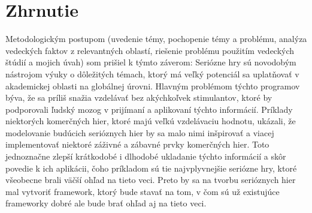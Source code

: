\documentclass[10pt,twoside,slovak,a4paper]{article}
\begin{document}
\section{Zhrnutie} \label{zaver}
Metodologickým postupom (uvedenie témy, pochopenie témy a problému, analýza vedeckých faktov z relevantných oblastí, riešenie problému použitím vedeckých štúdií a mojich úvah) som prišiel k týmto záverom: Seriózne hry sú novodobým nástrojom výuky o dôležitých témach, ktorý má veľký potenciál sa uplatňovať v akademickej oblasti na globálnej úrovni. Hlavným problémom týchto programov býva, že sa príliš snažia vzdelávať bez akýchkoľvek stimulantov, ktoré by podporovali ľudský mozog v prijímaní a aplikovaní týchto informácií. Príklady niektorých komerčných hier, ktoré majú veľkú vzdelávaciu hodnotu, ukázali, že modelovanie budúcich serióznych hier by sa malo nimi inšpirovať a viacej implementovať niektoré záživné a zábavné prvky komerčných hier. Toto jednoznačne zlepší krátkodobé i dlhodobé ukladanie týchto informácií a skôr povedie k ich aplikácii, čoho príkladom sú tie najvplyvnejšie seriózne hry, ktoré všeobecne brali väčší ohľad na tieto veci. Preto by sa na tvorbu serióznych hier mal vytvoriť framework, ktorý bude stavať na tom, v čom sú už existujúce frameworky dobré ale bude brať ohľad aj na tieto veci.



\end{document}
